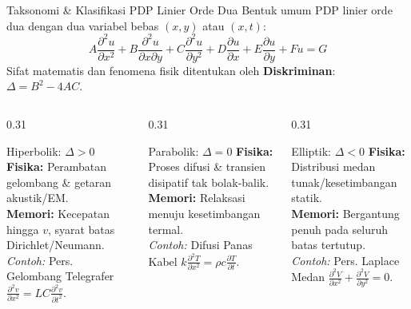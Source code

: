 \documentclass[aspectratio=169,10pt]{beamer}
\begin{document}
\begin{frame}{Taksonomi \& Klasifikasi PDP Linier Orde Dua}
  Bentuk umum PDP linier orde dua dengan dua variabel bebas $(x,y)$ atau $(x,t)$:
  \begin{equation*}
    A \frac{\partial^2 u}{\partial x^2} + B \frac{\partial^2 u}{\partial x \partial y} + C \frac{\partial^2 u}{\partial y^2} + D \frac{\partial u}{\partial x} + E \frac{\partial u}{\partial y} + F u = G
  \end{equation*}
  Sifat matematis dan fenomena fisik ditentukan oleh \textbf{Diskriminan}: $\Delta = B^2 - 4AC$.
  \vspace{0.1cm}
  \begin{columns}[t]
    \begin{column}{0.31\textwidth}
      \begin{block}{Hiperbolik: $\Delta > 0$}
        \small
        \textbf{Fisika:} Perambatan gelombang \& getaran akustik/EM.\\
        \textbf{Memori:} Kecepatan hingga $v$, syarat batas Dirichlet/Neumann.\\
        \textit{Contoh:} Pers. Gelombang Telegrafer $\frac{\partial^2 v}{\partial x^2} = LC \frac{\partial^2 v}{\partial t^2}$.
      \end{block}
    \end{column}
    \begin{column}{0.31\textwidth}
      \begin{alertblock}{Parabolik: $\Delta = 0$}
        \small
        \textbf{Fisika:} Proses difusi \& transien disipatif tak bolak-balik.\\
        \textbf{Memori:} Relaksasi menuju kesetimbangan termal.\\
        \textit{Contoh:} Difusi Panas Kabel $k \frac{\partial^2 T}{\partial x^2} = \rho c \frac{\partial T}{\partial t}$.
      \end{alertblock}
    \end{column}
    \begin{column}{0.31\textwidth}
      \begin{exampleblock}{Elliptik: $\Delta < 0$}
        \small
        \textbf{Fisika:} Distribusi medan tunak/kesetimbangan statik.\\
        \textbf{Memori:} Bergantung penuh pada seluruh batas tertutup.\\
        \textit{Contoh:} Pers. Laplace Medan $\frac{\partial^2 V}{\partial x^2} + \frac{\partial^2 V}{\partial y^2} = 0$.
      \end{exampleblock}
    \end{column}
  \end{columns}
\end{frame}
\end{document}
